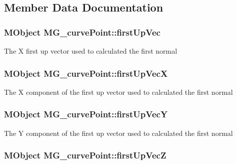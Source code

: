 \subsection{Member Data Documentation}
\hypertarget{class_m_g__curve_point_a79320a0786213a2898e043f8f98cecd0}{
\subsubsection[{first\-Up\-Vec}]{\setlength{\rightskip}{0pt plus 5cm}M\-Object M\-G\-\_\-curve\-Point\-::first\-Up\-Vec\hspace{0.3cm}{\ttfamily [static]}}}\label{class_m_g__curve_point_a79320a0786213a2898e043f8f98cecd0}
The X first up vector used to calculated the first normal \hypertarget{class_m_g__curve_point_ac612721b20d10233d1ba845ea983c679}{
\subsubsection[{first\-Up\-Vec\-X}]{\setlength{\rightskip}{0pt plus 5cm}M\-Object M\-G\-\_\-curve\-Point\-::first\-Up\-Vec\-X\hspace{0.3cm}{\ttfamily [static]}}}\label{class_m_g__curve_point_ac612721b20d10233d1ba845ea983c679}
The X component of the first up vector used to calculated the first normal \hypertarget{class_m_g__curve_point_a12473b7bc7699e71f1331123c73df9e7}{
\subsubsection[{first\-Up\-Vec\-Y}]{\setlength{\rightskip}{0pt plus 5cm}M\-Object M\-G\-\_\-curve\-Point\-::first\-Up\-Vec\-Y\hspace{0.3cm}{\ttfamily [static]}}}\label{class_m_g__curve_point_a12473b7bc7699e71f1331123c73df9e7}
The Y component of the first up vector used to calculated the first normal \hypertarget{class_m_g__curve_point_af30ebd37b5c2af1ef04940d817c010f8}{
\subsubsection[{first\-Up\-Vec\-Z}]{\setlength{\rightskip}{0pt plus 5cm}M\-Object M\-G\-\_\-curve\-Point\-::first\-Up\-Vec\-Z\hspace{0.3cm}{\ttfamily [static]}}}\label{class_m_g__curve_point_af30ebd37b5c2af1ef04940d817c010f8}
